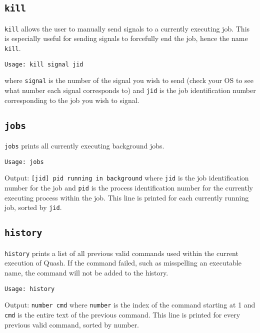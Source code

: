 \documentclass[12pt]{article}
\begin{document}
\subsection{\texttt{kill}}
\label{sec:orgbfa223e}
\texttt{kill} allows the user to manually send signals to a currently executing
job. This is especially useful for sending signals to forcefully end the job,
hence the name \texttt{kill}.
\begin{verbatim}
Usage: kill signal jid
\end{verbatim}
where \texttt{signal} is the number of the signal you wish to send (check your OS to
see what number each signal corresponds to) and \texttt{jid} is the job identification
number corresponding to the job you wish to signal.
\subsection{\texttt{jobs}}
\label{sec:orgedc422f}
\texttt{jobs} prints all currently executing background jobs.
\begin{verbatim}
Usage: jobs
\end{verbatim}
Output: \texttt{[jid] pid running in background} where \texttt{jid} is the job identification
number for the job and \texttt{pid} is the process identification number for the
currently executing process within the job. This line is printed for each
currently running job, sorted by \texttt{jid}.
\subsection{\texttt{history}}
\label{sec:org1fdf7a4}
\texttt{history} prints a list of all previous valid commands used within the current
execution of Quash. If the command failed, such as misspelling an executable
name, the command will not be added to the history.
\begin{verbatim}
Usage: history
\end{verbatim}
Output: \texttt{number cmd} where \texttt{number} is the index of the command starting
at 1 and \texttt{cmd} is the entire text of the previous command. This line is printed
for every previous valid command, sorted by number. 
\end{document}
